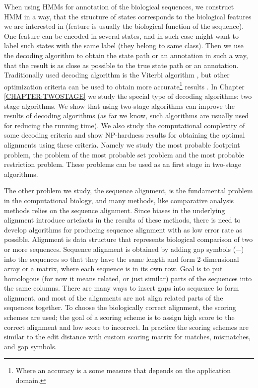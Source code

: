 When using HMMs for annotation of the biological sequences, we construct HMM in
a way, that the structure of states corresponds to the biological features we
are interested in (feature is usually the biological function of the sequence).
One feature can be encoded in several states, and in such case might want to
label such states with the same label (they belong to same class).  Then we use
the decoding algorithm to obtain the state path or an annotation in such a way,
that the result is as close as possible to the true state path or an
annotation. Traditionally used decoding algorithm is the Viterbi algorithm
\cite{Durbin1998}, but other optimization criteria can be used to obtain more
accurate\footnote{Where an accuracy is a some measure that depends on the
application domain.} results \cite{Brown2010, Gross2007, Nanasi2010,
Truszkowski2011}. In Chapter \ref{CHAPTER:TWOSTAGE} we study the special type
of decoding algorithms: two stage algorithms. We show that using two-stage
algorithms can improve the results of decoding algorithms (as far we know, such
algorithms are usually used for reducing the running time). We also study the
computational complexity of some decoding criteria and show NP-hardness results
for obtaining the optimal alignments using these criteria. Namely we study the
most probable footprint problem, the problem of the most probable set problem
and the most probable restriction problem. These problems can be used as an
first stage in two-stage algorithms.

The other problem we study, the sequence alignment, is the fundamental problem
in the computational biology, and many methods, like comparative analysis
methods relies on the sequence alignment. Since biases in the underlying
alignment introduce artefacts in the results of these methods, there is need to
develop algorithms for producing sequence alignment with as low error rate as
possible. Alignment is data structure that represents biological comparison of
two or more sequences. Sequence alignment is obtained by adding gap symbols
($-$) into the sequences so that they have the same length and form
2-dimensional array or a matrix, where each sequence is in its own row.  Goal
is to put homologous (for now it means related, or just similar) parts of the
sequences into the same columns. There are many ways to insert gaps into
sequence to form alignment, and most of the alignments are not align related
parts of the sequences together. To choose the biologically correct alignment,
the scoring schemes are used; the goal of a scoring scheme is to assign high
score to the correct alignment and low score to incorrect. In practice the
scoring schemes are similar to the edit distance with custom scoring matrix for
matches, mismatches, and gap symbols. 

